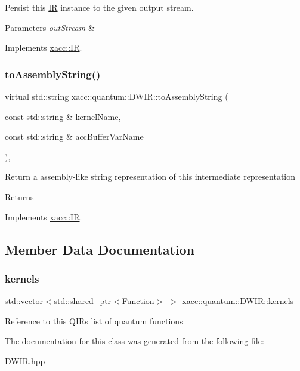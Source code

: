 Persist this \hyperlink{a01677}{IR} instance to the given output stream.


\begin{DoxyParams}{Parameters}
{\em out\+Stream} & \\
\hline
\end{DoxyParams}


Implements \hyperlink{a01677_a414b72224d88473ad6190bb88102a3ea}{xacc\+::\+IR}.

\mbox{\label{a01217_a880cb60197577ea31115331e3a030e3e}} 
\subsubsection{\texorpdfstring{to\+Assembly\+String()}{toAssemblyString()}}
{\footnotesize\ttfamily virtual std\+::string xacc\+::quantum\+::\+D\+W\+I\+R\+::to\+Assembly\+String (\begin{DoxyParamCaption}\item[{const std\+::string \&}]{kernel\+Name,  }\item[{const std\+::string \&}]{acc\+Buffer\+Var\+Name }\end{DoxyParamCaption})\hspace{0.3cm}{\ttfamily [inline]}, {\ttfamily [virtual]}}

Return a assembly-\/like string representation of this intermediate representation \begin{DoxyReturn}{Returns}

\end{DoxyReturn}


Implements \hyperlink{a01677_a8356cdff1919b88eabeb84fd7450cdb6}{xacc\+::\+IR}.



\subsection{Member Data Documentation}
\mbox{\label{a01217_abcb04ec3a152c3f22e5a757a9aecabf2}} 
\subsubsection{\texorpdfstring{kernels}{kernels}}
{\footnotesize\ttfamily std\+::vector$<$std\+::shared\+\_\+ptr$<$\hyperlink{a01653}{Function}$>$ $>$ xacc\+::quantum\+::\+D\+W\+I\+R\+::kernels\hspace{0.3cm}{\ttfamily [protected]}}

Reference to this Q\+IR\textquotesingle{}s list of quantum functions 

The documentation for this class was generated from the following file\+:\begin{DoxyCompactItemize}
\item 
D\+W\+I\+R.\+hpp\end{DoxyCompactItemize}
